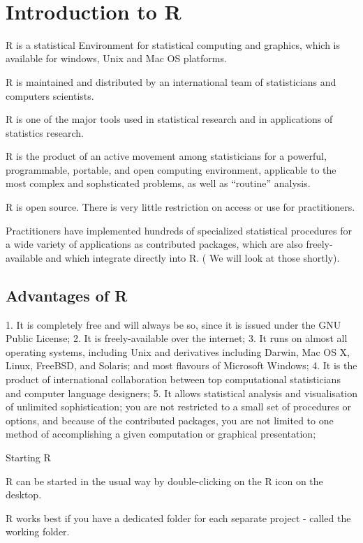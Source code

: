  \newpage
\section*{Introduction to R}


R is a statistical Environment for statistical computing and graphics, which is available for windows, Unix and Mac OS platforms.

R is maintained and distributed by an international team of statisticians and computers scientists.

R is one of the major tools used in statistical research and in applications of statistics research.

R is the product of an active movement among statisticians for a powerful, programmable, portable, and open computing environment, applicable to the most complex and sophsticated problems, as well as “routine” analysis.

R is open source. There is very little restriction on access or use for practitioners.

Practitioners have implemented hundreds of specialized statistical procedures for a wide variety of applications as contributed packages, which are also freely-available and which integrate directly into R. ( We will look at those shortly).

 
\subsection*{Advantages of R}

1. It is completely free and will always be so, since it is issued under the GNU Public License;
2. It is freely-available over the internet;
3. It runs on almost all operating systems, including Unix and derivatives including Darwin, Mac OS X, Linux, FreeBSD, and Solaris; and most flavours of Microsoft Windows;
4. It is the product of international collaboration between top computational statisticians and computer language designers;
5. It allows statistical analysis and visualisation of unlimited sophistication; you are not restricted to a small set of procedures or options, and because of the contributed packages, you are not limited to one method of accomplishing a given computation or graphical presentation;
 

Starting R


R can be started in the usual way by double-clicking on the R icon on the desktop.

R works best if you have a dedicated folder for each separate project - called the working folder.

